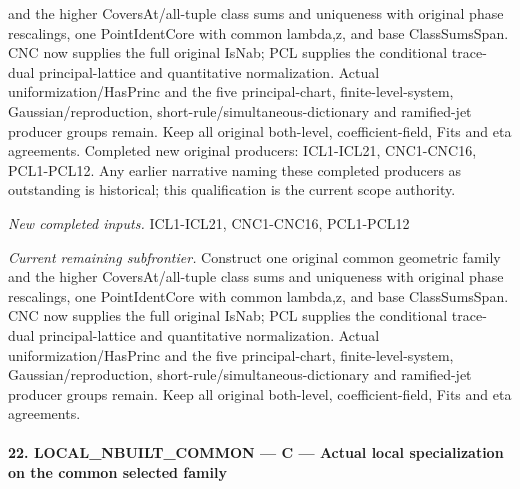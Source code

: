 \documentclass[11pt,a4paper]{article}
\numberwithin{equation}{section}
\theoremstyle{remark}\newtheorem{remark}[theorem]{Remark}
\begin{document}
and the higher CoversAt/all-tuple class sums and uniqueness with original phase rescalings, one PointIdentCore with common lambda,z, and base ClassSumsSpan. CNC now supplies the full original IsNab; PCL supplies the conditional trace-dual principal-lattice and quantitative normalization. Actual uniformization/HasPrinc and the five principal-chart, finite-level-system, Gaussian/reproduction, short-rule/simultaneous-dictionary and ramified-jet producer groups remain. Keep all original both-level, coefficient-field, Fits and eta agreements. Completed new original producers: ICL1-ICL21, CNC1-CNC16, PCL1-PCL12. Any earlier narrative naming these completed producers as outstanding is historical; this qualification is the current scope authority.

\emph{New completed inputs.} ICL1-ICL21, CNC1-CNC16, PCL1-PCL12

\emph{Current remaining subfrontier.} Construct one original common geometric family and the higher CoversAt/all-tuple class sums and uniqueness with original phase rescalings, one PointIdentCore with common lambda,z, and base ClassSumsSpan. CNC now supplies the full original IsNab; PCL supplies the conditional trace-dual principal-lattice and quantitative normalization. Actual uniformization/HasPrinc and the five principal-chart, finite-level-system, Gaussian/reproduction, short-rule/simultaneous-dictionary and ramified-jet producer groups remain. Keep all original both-level, coefficient-field, Fits and eta agreements.



\paragraph{22. LOCAL\_\allowbreak NBUILT\_\allowbreak COMMON — C — Actual local specialization on the common selected family}
\end{document}
